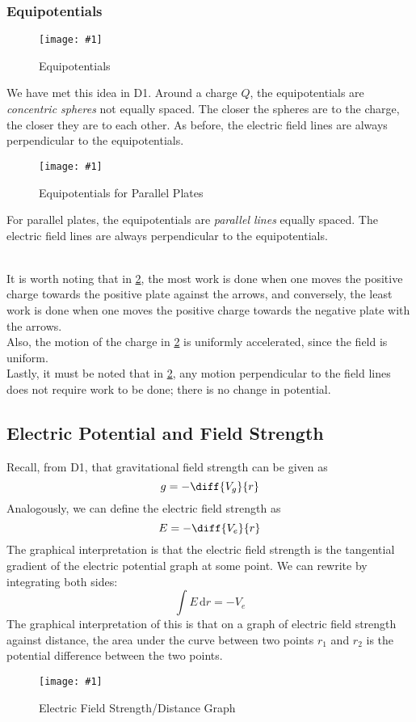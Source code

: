\documentclass[a4paper,12pt]{article}
\newcommand{\lb}{\\[8pt]}
\newcommand{\img}[4]{\begin{center}
  \begin{figure}[H]
    \centering
    \texttt{[image: \#1]}
    \caption{#3}
    \label{fig:#4}
  \end{figure}
\end{center}}
\begin{document}
\subsubsection{Equipotentials}

\begin{minipage}{0.45\textwidth}
  \img{sphereequipotential.png}{1}{Equipotentials}{sphereequipotential}

  We have met this idea in D1. Around a charge $Q$, the equipotentials are \textit{concentric spheres} not equally spaced. The closer the spheres are to the charge, the closer they are to each other. As before, the electric field lines are always perpendicular to the equipotentials.
\end{minipage}\hspace*{0.1\textwidth}
\begin{minipage}{0.45\textwidth}
  \img{platesequipotential.png}{1}{Equipotentials for Parallel Plates}{platesequipotential}

  For parallel plates, the equipotentials are \textit{parallel lines} equally spaced. The electric field lines are always perpendicular to the equipotentials.
\end{minipage}\lb

It is worth noting that in \cref{fig:platesequipotential}, the most work is done when one moves the positive charge towards the positive plate against the arrows, and conversely, the least work is done when one moves the positive charge towards the negative plate with the arrows.\lb
Also, the motion of the charge in \cref{fig:platesequipotential} is uniformly accelerated, since the field is uniform.\lb
Lastly, it must be noted that in \cref{fig:platesequipotential}, any motion perpendicular to the field lines does not require work to be done; there is no change in potential.

\pagebreak

\subsection{Electric Potential and Field Strength}
Recall, from D1, that gravitational field strength can be given as
$$g = -\diff{V_g}{r}$$
Analogously, we can define the electric field strength as
\begin{equation}\label{eq:potential2}
  E = -\diff{V_e}{r}
\end{equation}
The graphical interpretation is that the electric field strength is the tangential gradient of the electric potential graph at some point.
We can rewrite by integrating both sides:
$$
  \int E\,\mathrm{d}r = -V_e
$$
The graphical interpretation of this is that on a graph of electric field strength against distance, the area under the curve between two points $r_1$ and $r_2$ is the potential difference between the two points.
\img{Ergraph.png}{0.5}{Electric Field Strength/Distance Graph}{Ergraph}
\end{document}
